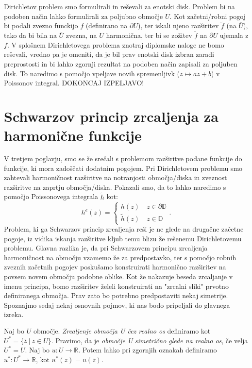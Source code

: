 \documentclass[mat1]{fmfdelo}
\begin{document}
    \begin{opomba}
        \label{alldisk}
        Dirichletov problem smo formulirali in reševali za enotski disk. Problem bi na podoben način lahko formulirali za poljubno območje $U$. 
        Kot začetni/robni pogoj bi podali zvezno funckijo $f$ (definirano na $\partial U$), ter iskali njeno razširitev $\widetilde{f}$ (na $\overline{U}$), tako da bi bila na $\overline{U}$ zvezna, 
        na $U$ harmonična, ter bi se zožitev $\widetilde{f}$ na $\partial U$ ujemala z $f$.
        V splošnem Dirichletovega problema znotraj diplomske naloge ne bomo reševali, vredno pa je omeniti, 
        da je bil prav enotski disk izbran zaradi preprostosti in bi lahko zgornji rezultat na podoben način zapisali za poljuben disk. To naredimo s pomočjo vpeljave novih spremenljivk ($z \mapsto az + b$) v Poissonov integral. 
        DOKONCAJ IZPELJAVO!
     \end{opomba}
\newpage
\section{Schwarzov princip zrcaljenja za harmonične funkcije}
    V tretjem poglavju, smo se že srečali s problemom razširitve podane funkcije do funkcije, ki mora zadoščati dodatnim pogojem. 
    Pri Dirichletovem problemu smo zahtevali harmoničnost razširitve na notranjosti območja/diska in zveznost razširitve na zaprtju območja/diska. 
    Pokazali smo, da to lahko naredimo s pomočjo Poissonovega integrala $\widetilde{h}$ kot:
    $$
        h^e(z) = 
        \begin{cases}
            h(z)~&z \in \partial \mathbb{D} \\
            \widetilde{h}(z)~&z \in \mathbb{D}
        \end{cases}.
    $$
    Problem, ki ga Schwarzov princip zrcaljenja reši je ne glede na drugačne začetne pogoje, iz vidika iskanja razširitve kljub temu blizu že rešenemu Dirichletovemu problemu.
    Glavna razlika je, da pri Schwarzovem principu zrcaljenja harmoničnost na območju vzamemo že za predpostavko, ter s pomočjo robnih zveznih začetnih pogojev poskušamo konstruirati harmonično razširitev na povsem novem območju podobne oblike.  
    Kot že nakazuje beseda zrcaljanje v imenu principa, bomo razširitev želeli konstruirati na "zrcalni sliki" prvotno definiranega območja. Prav zato bo potrebno predpostaviti nekaj simetrije.
    Spoznajmo sedaj nekaj osnovnih pojmov, ki nas bodo pripeljali do glavnega izreka.
    \begin{definicija}
        Naj bo $U$ območje. \emph{Zrcaljenje območja U čez realno os} definiramo kot $U^* = \{\overline{z}~|~z \in U\}$.
        \newline
        Pravimo, da je \emph{območje U simetrično glede na realno os}, če velja $U^* = U$.
        \newline
        Naj bo $u: U \to \mathbb{R}$. Potem lahko pri zgornjih oznakah definiramo $u^*: U^* \to \mathbb{R}$, kot $u^*(z) = u(\overline{z})$.
    \end{definicija}
\end{document}
